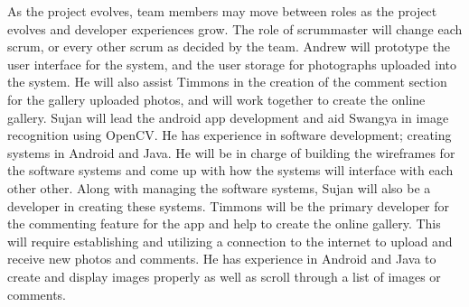 As the project evolves, team members may move between roles as the project evolves and developer experiences grow. The role of scrummaster will change each scrum, or every other scrum as decided by the team.
Andrew will prototype the user interface for the system, and the user storage for photographs uploaded into the system. He will also assist Timmons in the creation of the comment section for the gallery uploaded photos, and will work together to create the online gallery.
	Sujan will lead the android app development and aid Swangya in image recognition using OpenCV. He has experience in software development; creating systems in Android and Java. He will be in charge of building the wireframes for the software systems and come up with how the systems will interface with each other other. Along with managing the software systems, Sujan will also be a developer in creating these systems.
	Timmons will be the primary developer for the commenting feature for the app and help to create the online gallery. This will require establishing and utilizing a connection to the internet to upload and receive new photos and comments. He has experience in Android and Java to create and display images properly as well as scroll through a list of images or comments.
